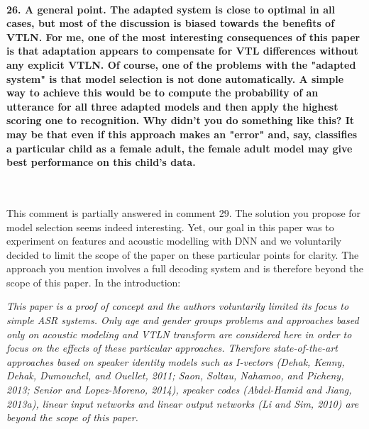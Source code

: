 \documentclass[]{article}
\begin{document}
\paragraph{26. A general point. The adapted system is close to optimal in all cases, but most of the discussion is biased towards the benefits of VTLN. For me, one of the most interesting consequences of this paper is that adaptation appears to compensate for VTL differences without any explicit VTLN. Of course, one of the problems with the "adapted system" is that model selection is not done automatically. A simple way to achieve this would be to compute the probability of an utterance for all three adapted models and then apply the highest scoring one to recognition. Why didn't you do something like this? It may be that even if this approach makes an "error" and, say, classifies a particular child as a female adult, the female adult model may give best performance on this child's data.}

~

This comment is partially answered in comment 29. The solution you propose for model selection seems indeed interesting. Yet, our goal in this paper was to experiment on features and acoustic modelling with DNN and we voluntarily decided to limit the scope of the paper on these particular points for clarity. The approach you mention involves a full decoding system and is therefore beyond the scope of this paper. In the introduction:

%

\textit{This paper is a proof of concept and the authors voluntarily limited its focus to simple ASR systems. Only  age and gender groups problems and approaches based only on acoustic modeling and VTLN transform are considered here in order to focus on the effects of these particular approaches. Therefore state-of-the-art approaches based on speaker identity models such as I-vectors (Dehak, Kenny, Dehak, Dumouchel, and Ouellet, 2011; Saon, Soltau, Nahamoo, and Picheny, 2013; Senior and Lopez-Moreno, 2014), speaker codes (Abdel-Hamid and Jiang, 2013a), linear input networks and linear output networks (Li and Sim, 2010) are beyond the scope of this paper.} %
\end{document}
